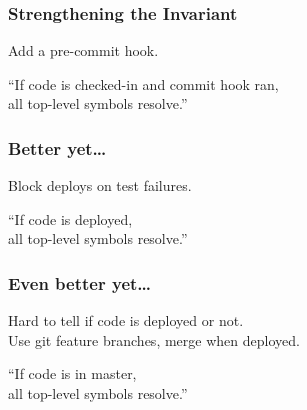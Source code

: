\documentclass{beamer}
\newenvironment{changemargin}[1]{%
  \begin{list}{}{%
    \setlength{\topsep}{0pt}%
    \setlength{\leftmargin}{#1}%
    \setlength{\rightmargin}{1em}
    \setlength{\listparindent}{\parindent}%
    \setlength{\itemindent}{\parindent}%
    \setlength{\parsep}{\parskip}%
  }%
  \item[]}{\end{list}}
\begin{document}
\begin{frame}
\frametitle{Strengthening the Invariant}

\begin{changemargin}{2cm}
Add a pre-commit hook.
\end{changemargin}

\begin{center}
``If code is checked-in and commit hook ran,\\ all top-level symbols resolve.''
\end{center}
\end{frame}

\begin{frame}
\frametitle{Better yet\ldots}

\begin{changemargin}{2cm}
Block deploys on test failures.
\end{changemargin}

\begin{center}
``If code is deployed,\\ all top-level symbols resolve.''
\end{center}
\end{frame}

\begin{frame}
\frametitle{Even better yet\ldots}

\begin{changemargin}{2cm}
Hard to tell if code is deployed or not.\\
Use git feature branches, merge when deployed.
\end{changemargin}
\begin{center}
``If code is in master,\\ all top-level symbols resolve.''
\end{center}
\end{frame}
\end{document}
